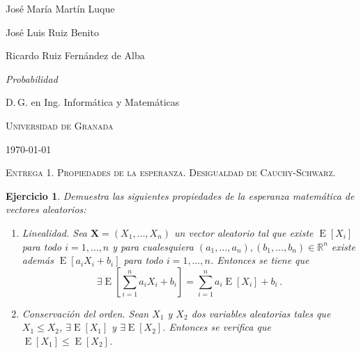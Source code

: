 \documentclass[
  a4paper,
  spanish,
  12pt,
]{scrartcl}
\theoremstyle{ejercicio-style}
\newtheorem{ejer}{Ejercicio}
\theoremstyle{remark-style}
\begin{document}
\begin{flushright}
  José María Martín Luque
  
  José Luis Ruiz Benito

  Ricardo Ruiz Fernández de Alba
  \vspace{.5em}

  \textit{Probabilidad}

  D.\,G. en Ing. Informática y Matemáticas

  \textsc{Universidad de Granada}\vspace{.5em}

  \today\vspace{.5em}
\end{flushright}

\begin{flushleft}
  \scshape\Large Entrega 1. Propiedades de la esperanza. Desigualdad de Cauchy-Schwarz.
\end{flushleft}

\begin{ejer}
  Demuestra las siguientes propiedades de la esperanza matemática de vectores aleatorios: \begin{enumerate}
    \item Linealidad. Sea \(\symbf{X} = (X_1, \dots, X_n)\) un vector aleatorio tal que existe \(\operatorname{E}[X_i]\) para todo \(i = 1, \dots, n\) y para cualesquiera \((a_1, \dots, a_n), (b_1, \dots, b_n) \in \mathbb R^n\) existe además \(\operatorname{E}[a_iX_i + b_i]\) para todo \(i = 1, \dots, n\). Entonces se tiene que \[
      \exists \operatorname{E}\left[\sum_{i=1}^n a_iX_i + b_i\right] =  \sum_{i=1}^{n}a_i \operatorname{E}[X_i] + b_i\,.
    \]
    \item Conservación del orden. Sean \(X_1\) y \(X_2\) dos variables aleatorias tales que \(X_1 \leq X_2\), \(\exists \operatorname{E}[X_1]\) y \(\exists \operatorname{E}[X_2]\). Entonces se verifica que \(\operatorname{E}[X_1] \leq \operatorname{E}[X_2]\).
  \end{enumerate}
\end{ejer}
\end{document}
